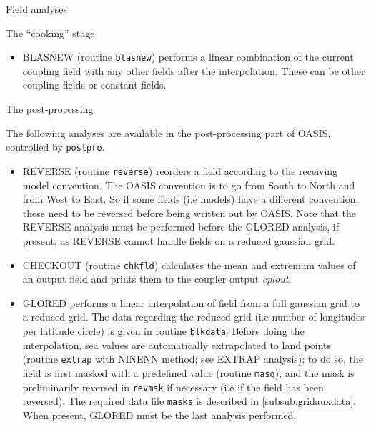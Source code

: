 \begin{subsection}{Field analyses}
\begin{subsubsection}{The ``cooking'' stage}
\begin{itemize}
\item BLASNEW (routine {\tt blasnew}) performs a linear combination 
of the current coupling field with any other fields after the
interpolation. These can be other coupling fields 
or constant fields.

\end{itemize}

\end{subsubsection}

\begin{subsubsection}{The post-processing}
\label{subsubsec_postpro}

The following analyses are available in the post-processing part of
OASIS, controlled by {\tt postpro}.

\begin{itemize}
\item REVERSE (routine {\tt reverse}) reorders a field according to
the receiving model convention. The OASIS convention is to go from 
South to North and from West to East. So if some fields 
(i.e models) have a different convention, these need to be reversed 
before being written out by OASIS. Note that the REVERSE analysis must
be performed before the GLORED analysis, if present, as REVERSE cannot
handle fields on a reduced gaussian grid.
 
\item CHECKOUT (routine {\tt chkfld}) calculates the mean and extremum
values of an output field and prints them to the coupler output {\em cplout}.

\item GLORED performs a linear interpolation of field from a full 
gaussian grid to a reduced grid. The data regarding the reduced grid 
(i.e number of longitudes per latitude circle) is given in routine 
{\tt blkdata}. Before doing the interpolation, sea values are
automatically extrapolated to land points (routine {\tt extrap} with
NINENN method; see EXTRAP analysis); to
do so, the field is first masked with a predefined value 
(routine {\tt masq}), and the mask is preliminarily reversed 
in {\tt revmsk} if necessary (i.e if the field has been reversed).
The required data file {\tt masks} is described in
\ref{subsub.gridauxdata}. 
When present, GLORED must be the last analysis performed.

\end{itemize}

\end{subsubsection}
\end{subsection}